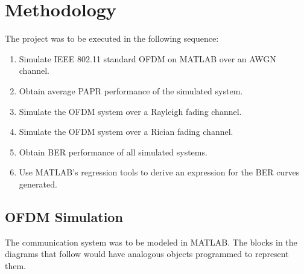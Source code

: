 \chapter{Methodology}
The project was to be executed in the following sequence:
\begin{enumerate}[label=\roman*.]
	\item Simulate IEEE 802.11 standard \gls{OFDM} on MATLAB over an \gls{AWGN} channel.
	\item Obtain average \gls{PAPR} performance of the simulated system.
	\item Simulate the \gls{OFDM} system over a Rayleigh fading channel.
	\item Simulate the \gls{OFDM} system over a Rician fading channel.
	\item Obtain \gls{BER} performance of all simulated systems.
	\item Use MATLAB's regression tools to derive an expression for the \gls{BER} curves generated.
\end{enumerate}

\section{OFDM Simulation}
The communication system was to be modeled in MATLAB. The blocks in the diagrams that follow would have analogous objects programmed to represent them.
